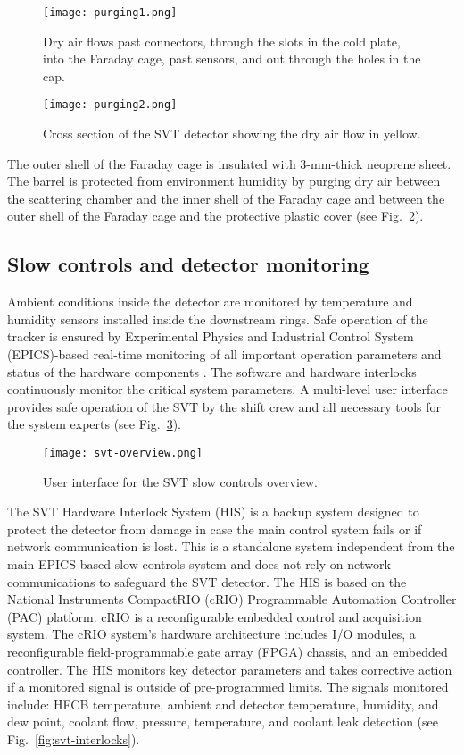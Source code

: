 \begin{figure}[hbt] 
\centering 
\texttt{[image: purging1.png]}
\caption{Dry air flows past connectors, through the slots in the cold plate, into the Faraday cage, past sensors, and out through the holes in the cap.}
\label{fig:purging1}
\end{figure}

\begin{figure}[hbt] 
\centering 
\texttt{[image: purging2.png]}
\caption{Cross section of the SVT detector showing the dry air flow in yellow.}
\label{fig:purging2}
\end{figure}

The outer shell of the Faraday cage is insulated with 3-mm-thick neoprene sheet. The barrel is protected from environment humidity by purging dry air between the scattering chamber and the inner shell of the Faraday cage and between the outer shell of the Faraday cage and the protective plastic cover (see Fig.~\ref{fig:purging2}). 

\subsection{Slow controls and detector monitoring}

Ambient conditions inside the detector are monitored by temperature and humidity sensors installed inside the downstream rings. Safe operation of the tracker is ensured by Experimental Physics and Industrial Control System (EPICS)-based real-time monitoring of all important operation parameters and status of the hardware components \cite{EPICS}. The software and hardware interlocks continuously monitor the critical system parameters. A multi-level user interface provides safe operation of the SVT by the shift crew and all necessary tools for the system experts (see Fig.~\ref{fig:svt-overview}).

\begin{figure}[hbt] 
\centering 
\texttt{[image: svt-overview.png]}
\caption{User interface for the SVT slow controls overview.}
\label{fig:svt-overview}
\end{figure}

The SVT Hardware Interlock System (HIS) is a backup system designed to protect the detector from damage in case the main control system fails or if network communication is lost. This is a standalone system independent from the main EPICS-based slow controls system and does not rely on network communications to safeguard the SVT detector. The HIS is based on the National Instruments CompactRIO (cRIO) Programmable Automation Controller (PAC) platform. cRIO is a reconfigurable embedded control and acquisition system. The cRIO system's hardware architecture includes I/O modules, a reconfigurable field-programmable gate array (FPGA) chassis, and an embedded controller. The HIS monitors key detector parameters and takes corrective action if a monitored signal is outside of pre-programmed limits. The signals monitored include: HFCB temperature, ambient and detector temperature, humidity, and dew point, coolant flow, pressure, temperature, and coolant leak detection (see Fig.~\ref{fig:svt-interlocks}). 

